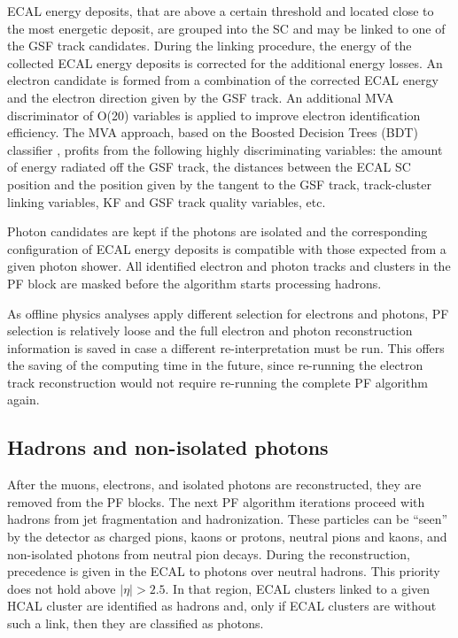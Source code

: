 ECAL energy deposits, that are above a certain threshold and located close to the most energetic deposit, are grouped into the SC and may be linked to one of the GSF track candidates. During the linking procedure, the energy of the collected ECAL energy deposits is corrected for the additional energy losses. An electron candidate is formed from a combination of the corrected ECAL energy and the electron direction given by the GSF track. An additional MVA discriminator of O(20) variables is applied to improve electron identification efficiency. The MVA approach, based on the Boosted Decision Trees (BDT) classifier \cite{TMVA}, profits from the following highly discriminating variables: the amount of energy radiated off the GSF track, the distances between the ECAL SC position and the position given by the tangent to the GSF track, track-cluster linking variables, KF and GSF track quality variables, etc. 

Photon candidates are kept if the photons are isolated and the corresponding configuration of ECAL energy deposits is compatible with those expected from a given photon shower.  All identified electron and photon tracks and clusters in the PF block are masked before the algorithm starts processing hadrons. 

As offline physics analyses apply different selection for electrons and photons, PF selection is relatively loose and  the full electron and photon reconstruction information is saved in case a different re-interpretation must be run. This offers the saving of the computing time in the future, since re-running the electron track reconstruction would not require re-running the complete PF algorithm again.

\subsection{Hadrons and non-isolated photons}\label{sec:hadrons}

After the muons, electrons, and isolated photons are reconstructed, they are removed from the PF blocks. The next PF algorithm iterations proceed with hadrons from jet fragmentation and hadronization. These particles can be ``seen'' by the detector as charged pions, kaons or protons, neutral pions and kaons, and non-isolated photons from neutral pion decays. During the reconstruction, precedence is given in the ECAL to photons over neutral hadrons. This priority does not hold above $|\eta| > 2.5$. In that region, ECAL clusters linked to a given HCAL cluster are identified as hadrons and, only if ECAL clusters are without such a link, then they are classified as photons.  

